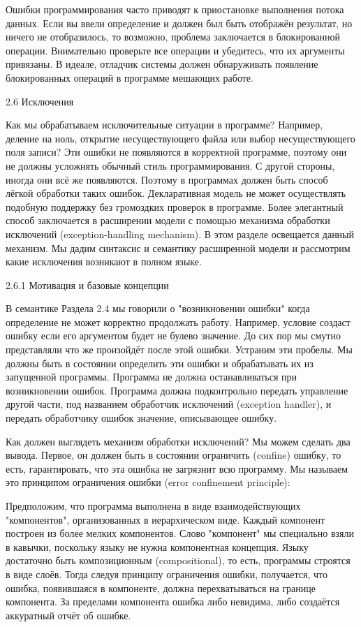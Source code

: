Ошибки программирования часто приводят к приостановке выполнения потока данных. Если вы ввели определение и должен был быть отображён результат, но ничего не отобразилось, то возможно, проблема заключается в блокированной операции. Внимательно проверьте все операции и убедитесь, что их аргументы привязаны. В идеале, отладчик системы должен обнаруживать появление блокированных операций в программе мешающих работе.

2.6 Исключения

Как мы обрабатываем исключительные ситуации в программе? Например, деление на ноль, открытие несуществующего файла или выбор несуществующего поля записи? Эти ошибки не появляются в корректной программе, поэтому они не должны усложнять обычный стиль программирования. С другой стороны, иногда они всё же появляются. Поэтому в программах должен быть способ лёгкой обработки таких ошибок. Декларативная модель не может осуществлять подобную поддержку без громоздких проверок в программе. Более элегантный способ заключается в расширении модели с помощью механизма обработки исключений (exception-handling mechanism). В этом разделе освещается данный механизм. Мы дадим синтаксис и семантику расширенной модели и рассмотрим какие исключения возникают в полном языке.

2.6.1 Мотивация и базовые концепции

В семантике Раздела 2.4 мы говорили о "возникновении ошибки" когда определение не может корректно продолжать работу. Например, условие создаст ошибку если его аргументом будет не булево значение. До сих пор мы смутно представляли что же произойдёт после этой ошибки. Устраним эти пробелы. Мы должны быть в состоянии определить эти ошибки и обрабатывать их из запущенной программы. Программа не должна останавливаться при возникновении ошибок. Программа должна подконтрольно передать управление другой части, под названием обработчик исключений (exception handler), и передать обработчику ошибок значение, описывающее ошибку.

Как должен выглядеть механизм обработки исключений? Мы можем сделать два вывода. Первое, он должен быть в состоянии ограничить (confine) ошибку, то есть, гарантировать, что эта ошибка не загрязнит всю программу. Мы называем это принципом ограничения ошибки (error confinement principle):

Предположим, что программа выполнена в виде взаимодействующих "компонентов", организованных в иерархическом виде. Каждый компонент построен из более мелких компонентов. Слово "компонент" мы специально взяли в кавычки, поскольку языку не нужна компонентная концепция. Языку достаточно быть композиционным (compositional), то есть, программы строятся в виде слоёв. Тогда следуя принципу ограничения ошибки, получается, что ошибка, появившаяся в компоненте, должна перехватываться на границе компонента. За пределами компонента ошибка либо невидима, либо создаётся аккуратный отчёт об ошибке.

